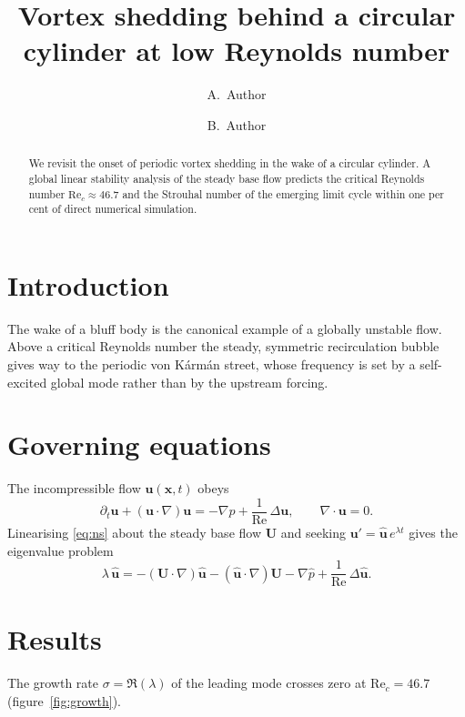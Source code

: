 \documentclass[11pt]{article}
\title{Vortex shedding behind a circular cylinder at low Reynolds number}
\author{A.~Author \and B.~Author}
\date{}
\begin{document}
\maketitle
\begin{abstract}
We revisit the onset of periodic vortex shedding in the wake of a circular cylinder.
A global linear stability analysis of the steady base flow predicts the critical
Reynolds number $\mathrm{Re}_c \approx 46.7$ and the Strouhal number of the emerging
limit cycle within one per cent of direct numerical simulation.
\end{abstract}

\section{Introduction}
The wake of a bluff body is the canonical example of a globally unstable flow.
Above a critical Reynolds number the steady, symmetric recirculation bubble gives way
to the periodic von K\'arm\'an street, whose frequency is set by a self-excited
global mode rather than by the upstream forcing.

\section{Governing equations}
The incompressible flow $\mathbf{u}(\mathbf{x},t)$ obeys
\begin{equation}
\partial_t \mathbf{u} + (\mathbf{u}\cdot\nabla)\mathbf{u} = -\nabla p + \frac{1}{\mathrm{Re}}\,\Delta\mathbf{u},
\qquad \nabla\cdot\mathbf{u} = 0 .
\label{eq:ns}
\end{equation}
Linearising \eqref{eq:ns} about the steady base flow $\mathbf{U}$ and seeking
$\mathbf{u}' = \hat{\mathbf{u}}\,e^{\lambda t}$ gives the eigenvalue problem
\begin{equation}
\lambda\,\hat{\mathbf{u}} = -(\mathbf{U}\cdot\nabla)\hat{\mathbf{u}} - (\hat{\mathbf{u}}\cdot\nabla)\mathbf{U}
- \nabla\hat p + \frac{1}{\mathrm{Re}}\,\Delta\hat{\mathbf{u}} .
\end{equation}

\section{Results}
The growth rate $\sigma = \Re(\lambda)$ of the leading mode crosses zero at
$\mathrm{Re}_c = 46.7$ (figure~\ref{fig:growth}).
\end{document}
